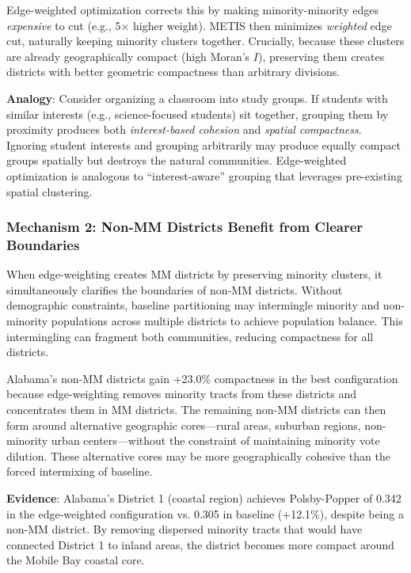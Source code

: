 Edge-weighted optimization corrects this by making minority-minority edges \emph{expensive} to cut (e.g., 5× higher weight). METIS then minimizes \emph{weighted} edge cut, naturally keeping minority clusters together. Crucially, because these clusters are already geographically compact (high Moran's $I$), preserving them creates districts with better geometric compactness than arbitrary divisions.

\textbf{Analogy}: Consider organizing a classroom into study groups. If students with similar interests (e.g., science-focused students) sit together, grouping them by proximity produces both \emph{interest-based cohesion} and \emph{spatial compactness}. Ignoring student interests and grouping arbitrarily may produce equally compact groups spatially but destroys the natural communities. Edge-weighted optimization is analogous to ``interest-aware'' grouping that leverages pre-existing spatial clustering.

\subsubsection{Mechanism 2: Non-MM Districts Benefit from Clearer Boundaries}

When edge-weighting creates MM districts by preserving minority clusters, it simultaneously clarifies the boundaries of non-MM districts. Without demographic constraints, baseline partitioning may intermingle minority and non-minority populations across multiple districts to achieve population balance. This intermingling can fragment both communities, reducing compactness for all districts.

Alabama's non-MM districts gain +23.0\% compactness in the best configuration because edge-weighting removes minority tracts from these districts and concentrates them in MM districts. The remaining non-MM districts can then form around alternative geographic cores---rural areas, suburban regions, non-minority urban centers---without the constraint of maintaining minority vote dilution. These alternative cores may be more geographically cohesive than the forced intermixing of baseline.

\textbf{Evidence}: Alabama's District 1 (coastal region) achieves Polsby-Popper of 0.342 in the edge-weighted configuration vs. 0.305 in baseline (+12.1\%), despite being a non-MM district. By removing dispersed minority tracts that would have connected District 1 to inland areas, the district becomes more compact around the Mobile Bay coastal core.

